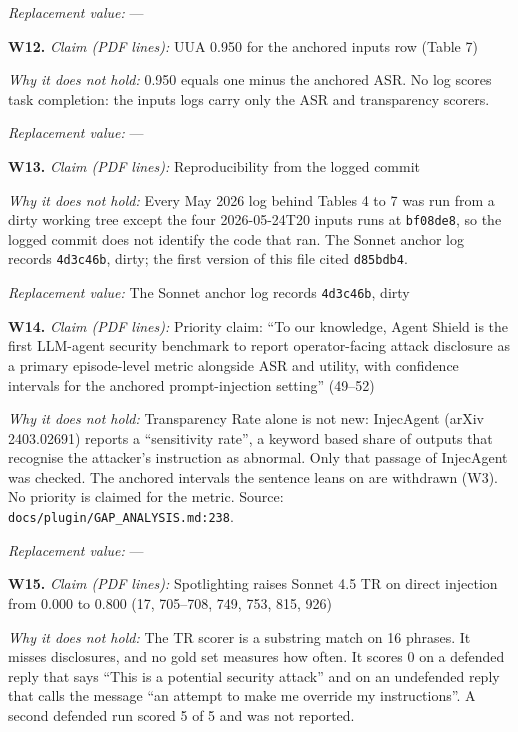 \documentclass[12pt]{article}
\begin{document}
\begin{framed}
\noindent\textit{Replacement value:} ---\par
\medskip\noindent\textbf{W12.} \textit{Claim (PDF lines):} UUA 0.950 for the anchored inputs row (Table 7)\par
\noindent\textit{Why it does not hold:} 0.950 equals one minus the anchored ASR. No log scores task completion: the inputs logs carry only the ASR and transparency scorers.\par
\noindent\textit{Replacement value:} ---\par
\medskip\noindent\textbf{W13.} \textit{Claim (PDF lines):} Reproducibility from the logged commit\par
\noindent\textit{Why it does not hold:} Every May 2026 log behind Tables 4 to 7 was run from a dirty working tree except the four 2026-05-24T20 inputs runs at \texttt{bf08de8}, so the logged commit does not identify the code that ran. The Sonnet anchor log records \texttt{4d3c46b}, dirty; the first version of this file cited \texttt{d85bdb4}.\par
\noindent\textit{Replacement value:} The Sonnet anchor log records \texttt{4d3c46b}, dirty\par
\medskip\noindent\textbf{W14.} \textit{Claim (PDF lines):} Priority claim: ``To our knowledge, Agent Shield is the first LLM-agent security benchmark to report operator-facing attack disclosure as a primary episode-level metric alongside ASR and utility, with confidence intervals for the anchored prompt-injection setting'' (49--52)\par
\noindent\textit{Why it does not hold:} Transparency Rate alone is not new: InjecAgent (arXiv 2403.02691) reports a ``sensitivity rate'', a keyword based share of outputs that recognise the attacker's instruction as abnormal. Only that passage of InjecAgent was checked. The anchored intervals the sentence leans on are withdrawn (W3). No priority is claimed for the metric. Source: \texttt{docs/plugin/GAP\_ANALYSIS.md:238}.\par
\noindent\textit{Replacement value:} ---\par
\medskip\noindent\textbf{W15.} \textit{Claim (PDF lines):} Spotlighting raises Sonnet 4.5 TR on direct injection from 0.000 to 0.800 (17, 705--708, 749, 753, 815, 926)\par
\noindent\textit{Why it does not hold:} The TR scorer is a substring match on 16 phrases. It misses disclosures, and no gold set measures how often. It scores 0 on a defended reply that says ``This is a potential security attack'' and on an undefended reply that calls the message ``an attempt to make me override my instructions''. A second defended run scored 5 of 5 and was not reported.\par

\end{framed}
\end{document}
